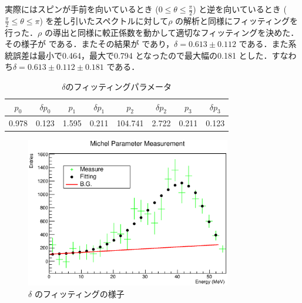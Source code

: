 実際にはスピンが手前を向いているとき ($0\leq\theta\leq\frac{\pi}{2}$) と逆を向いているとき ($\frac{\pi}{2}\leq\theta\leq\pi$) を差し引いたスペクトルに対して$\rho$ の解析と同様にフィッティングを行った．$\rho$ の導出と同様に較正係数を動かして適切なフィッティングを決めた．その様子が である．またその結果が であり，$\delta=0.613\pm0.112$ である．また系統誤差は最小で0.464，最大で0.794 となったので最大幅の0.181 とした．すなわち$\delta=0.613\pm0.112\pm0.181$ である．
\begin{table}[hbt]
\centering
\caption{$\delta$のフィッティングパラメータ}
\begin{tabular}{cccccccc}
$p_0$ & $\delta p_0$ & $p_1$ & $\delta p_1$ & $p_2$ & $\delta p_2$ & $p_3$ & $\delta p_3$ \\ \hline
0.978 & 0.123 & 1.595 & 0.211 & 104.741 & 2.722 & 0.211 & 0.123 \\
\end{tabular}
\label{hatano_tab:delta}
\end{table}

\begin{figure}[hbt]
\centering
\includegraphics[width=0.8\textwidth]{figure/hatano/delta.eps}
\caption{$\delta$ のフィッティングの様子}
\label{hatano_fig:delta}
\end{figure}

%
